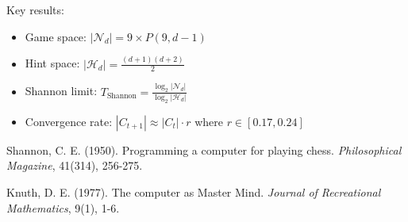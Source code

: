 \documentclass{article}
\begin{document}
Key results:
\begin{itemize}
\item Game space: $|\mathcal{N}_d| = 9 \times P(9, d-1)$
\item Hint space: $|\mathcal{H}_d| = \frac{(d+1)(d+2)}{2}$
\item Shannon limit: $T_{\text{Shannon}} = \frac{\log_2 |\mathcal{N}_d|}{\log_2 |\mathcal{H}_d|}$
\item Convergence rate: $|C_{t+1}| \approx |C_t| \cdot r$ where $r \in [0.17, 0.24]$
\end{itemize}

\begin{thebibliography}{9}

Shannon, C. E. (1950). Programming a computer for playing chess. \textit{Philosophical Magazine}, 41(314), 256-275.

Knuth, D. E. (1977). The computer as Master Mind. \textit{Journal of Recreational Mathematics}, 9(1), 1-6.

\end{thebibliography}
\end{document}
